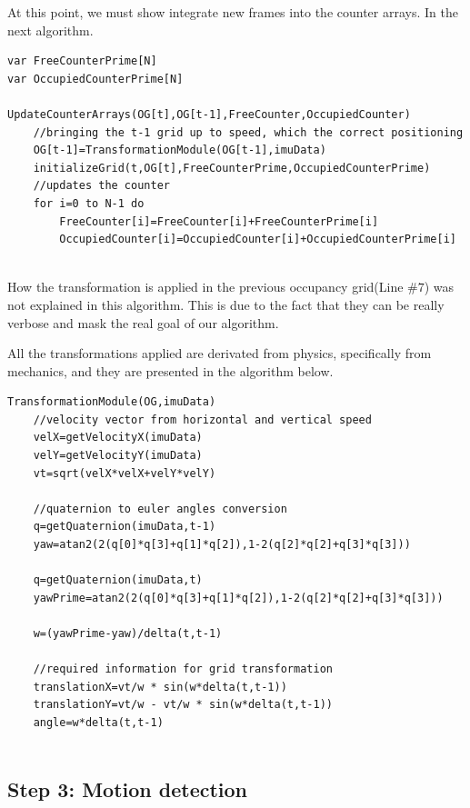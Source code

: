At this point, we must show integrate new frames into the counter arrays. In the next algorithm.

\begin{lstlisting}[title={Newframes},label=al:newframes,caption={Integrating new frames}]
var FreeCounterPrime[N]
var OccupiedCounterPrime[N]

UpdateCounterArrays(OG[t],OG[t-1],FreeCounter,OccupiedCounter)
	//bringing the t-1 grid up to speed, which the correct positioning
	OG[t-1]=TransformationModule(OG[t-1],imuData)
	initializeGrid(t,OG[t],FreeCounterPrime,OccupiedCounterPrime)
	//updates the counter
	for i=0 to N-1 do
		FreeCounter[i]=FreeCounter[i]+FreeCounterPrime[i]
		OccupiedCounter[i]=OccupiedCounter[i]+OccupiedCounterPrime[i]
	
\end{lstlisting}

How the transformation is applied in the previous occupancy grid(Line $\#7$) was not explained in this algorithm. This is due to the fact that they can be really verbose and mask the real goal of our algorithm. 

All the transformations applied are derivated from physics, specifically from mechanics, and they are presented in the algorithm below.

\begin{lstlisting}[title={Transformation},label=al:transformation,caption={Previous grid transformation}]
TransformationModule(OG,imuData)
	//velocity vector from horizontal and vertical speed	
	velX=getVelocityX(imuData)
	velY=getVelocityY(imuData)
	vt=sqrt(velX*velX+velY*velY)
	
	//quaternion to euler angles conversion	
	q=getQuaternion(imuData,t-1)
	yaw=atan2(2(q[0]*q[3]+q[1]*q[2]),1-2(q[2]*q[2]+q[3]*q[3]))	

	q=getQuaternion(imuData,t)
	yawPrime=atan2(2(q[0]*q[3]+q[1]*q[2]),1-2(q[2]*q[2]+q[3]*q[3]))	
	
	w=(yawPrime-yaw)/delta(t,t-1)
	
	//required information for grid transformation	
	translationX=vt/w * sin(w*delta(t,t-1))
	translationY=vt/w - vt/w * sin(w*delta(t,t-1))
	angle=w*delta(t,t-1)
		
\end{lstlisting}

\subsection{Step 3: Motion detection}

